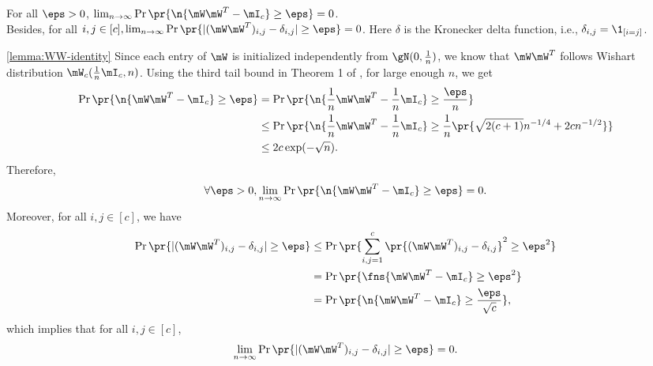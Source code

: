 \begin{lemma}
\label{lemma:WW-identity}
For all $\eps>0$, $\lim_{n\to\infty}\Pr\pr{\n{\mW\mW^T-\mI_c}\geq\eps}=0$.\\Besides, for all $i,j\in[c], \lim_{n\to\infty}\Pr\pr{|(\mW\mW^T)_{i,j}-\delta_{i,j}|\geq\eps}=0$. Here $\delta$ is the Kronecker delta function, i.e., $\delta_{i,j} = \1_{[i=j]}$.
\end{lemma}
\begin{proofof}{\cref{lemma:WW-identity}}
Since each entry of $\mW$ is initialized independently from $\gN(0,\frac1n)$, we know that $\mW\mW^T$ follows Wishart distribution $\mW_c(\frac1n \mI_c,n)$. Using the third tail bound in Theorem 1 of \cite{zhu2012short}, for large enough $n$, we get
\begin{equation}
\begin{split}
\Pr\pr{\n{\mW\mW^T-\mI_c}\geq\eps} &=\Pr\pr{\n{\frac1n\mW\mW^T-\frac1n\mI_c}\geq\frac{\eps}{n}}\\
&\leq \Pr\pr{\n{\frac1n\mW\mW^T-\frac1n\mI_c}\geq\frac1n\pr{\sqrt{2(c+1)}n^{-1/4}+2cn^{-1/2}}}\\
&\leq 2c\exp(-\sqrt{n}).
\end{split}
\end{equation}
Therefore,
\begin{equation}
\forall\eps>0, \lim_{n\to\infty}\Pr\pr{\n{\mW\mW^T-\mI_c}\geq\eps}=0.
\end{equation}
Moreover, for all $i,j\in[c]$, we have
\begin{equation}
\begin{split}
\Pr\pr{|(\mW\mW^T)_{i,j}-\delta_{i,j}|\geq\eps} &\leq\Pr\pr{\sum_{i,j=1}^c\pr{(\mW\mW^T)_{i,j}-\delta_{i,j}}^2\geq\eps^2}\\
&=\Pr\pr{\fns{\mW\mW^T-\mI_c}\geq\eps^2}\\
&=\Pr\pr{\n{\mW\mW^T-\mI_c}\geq\frac{\eps}{\sqrt{c}}},
\end{split}
\end{equation}
which implies that for all $i,j\in[c]$,
\begin{equation}
\lim_{n\to\infty}\Pr\pr{|(\mW\mW^T)_{i,j}-\delta_{i,j}|\geq\eps}=0.
\end{equation}
\end{proofof}

